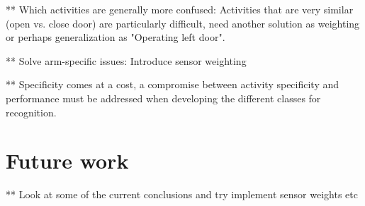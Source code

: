 \documentclass{sig-alternate}
\begin{document}
** Which activities are generally more confused:
Activities that are very similar (open vs. close door) are particularly difficult, need another solution as weighting or perhaps generalization as "Operating left door".

** Solve arm-specific issues: Introduce sensor weighting

** Specificity comes at a cost, a compromise between activity specificity and performance must be addressed when developing the different classes for recognition.


\section{Future work}

** Look at some of the current conclusions and try implement sensor weights etc





\end{document}
